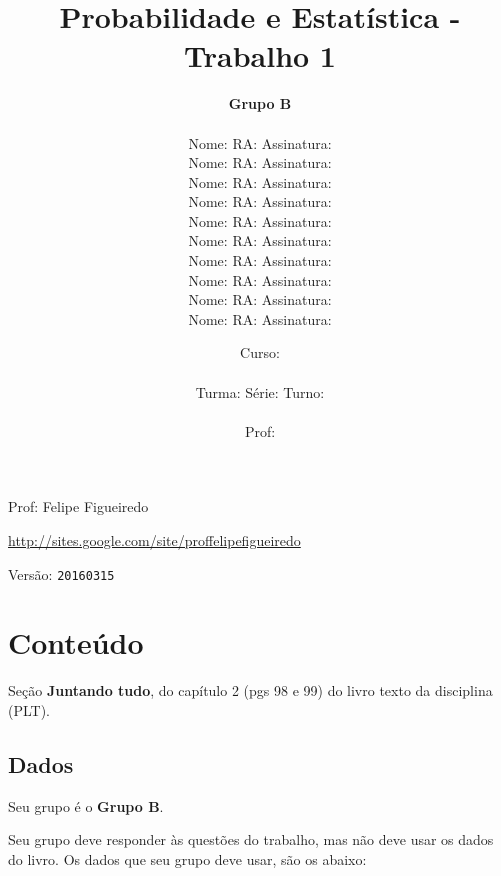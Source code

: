 \documentclass[a4paper]{article}
\date{
\bigskip
Curso: \underline{\hspace{8cm}}\\
\ \\
Turma: \underline{\hspace{1cm}} Série: \underline{\hspace{1cm}} Turno:
\underline{\hspace{1cm}}\\
\ \\
Prof: \underline{\hspace{8cm}}\\
}
\title{Probabilidade e Estatística - Trabalho 1}
\author{
{\bf Grupo B}\\
\ \\
Nome: \underline{\hspace{6cm}} RA: \underline{\hspace{2cm}} Assinatura: \underline{\hspace{4cm}}\\
Nome: \underline{\hspace{6cm}} RA: \underline{\hspace{2cm}} Assinatura: \underline{\hspace{4cm}}\\
Nome: \underline{\hspace{6cm}} RA: \underline{\hspace{2cm}} Assinatura: \underline{\hspace{4cm}}\\
Nome: \underline{\hspace{6cm}} RA: \underline{\hspace{2cm}} Assinatura: \underline{\hspace{4cm}}\\
Nome: \underline{\hspace{6cm}} RA: \underline{\hspace{2cm}} Assinatura: \underline{\hspace{4cm}}\\
Nome: \underline{\hspace{6cm}} RA: \underline{\hspace{2cm}} Assinatura: \underline{\hspace{4cm}}\\
Nome: \underline{\hspace{6cm}} RA: \underline{\hspace{2cm}} Assinatura: \underline{\hspace{4cm}}\\
Nome: \underline{\hspace{6cm}} RA: \underline{\hspace{2cm}} Assinatura: \underline{\hspace{4cm}}\\
Nome: \underline{\hspace{6cm}} RA: \underline{\hspace{2cm}} Assinatura: \underline{\hspace{4cm}}\\
Nome: \underline{\hspace{6cm}} RA: \underline{\hspace{2cm}} Assinatura: \underline{\hspace{4cm}}\\
}
\begin{document}
\maketitle
\newpage

\parbox[c]{.825\textwidth}{\raggedright%
{Prof: Felipe Figueiredo\par}
{\url{http://sites.google.com/site/proffelipefigueiredo}\par}
}

Versão: \verb|20160315|




\section{Conteúdo}

Seção {\bf Juntando tudo}, do capítulo 2 (pgs 98 e 99) do livro texto da disciplina (PLT). 

\subsection{Dados}
Seu grupo é o {\bf Grupo B}.

Seu grupo deve responder às questões do trabalho, mas não deve usar os dados do livro. Os dados que seu grupo deve usar, são os abaixo:
\end{document}

